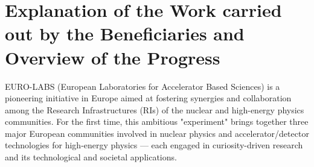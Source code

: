 
\clearpage
\section{Explanation of the Work carried out by the Beneficiaries and Overview of the Progress}
\label{sec:work-carried-out}




EURO-LABS (European Laboratories for Accelerator Based Sciences) is a pioneering initiative in Europe aimed at fostering synergies and collaboration among the Research Infrastructures (RIs) of the nuclear and high-energy physics communities. For the first time, this ambitious "experiment" brings together three major European communities involved in nuclear physics and accelerator/detector technologies for high-energy physics — each engaged in curiosity-driven research and its technological and societal applications.

